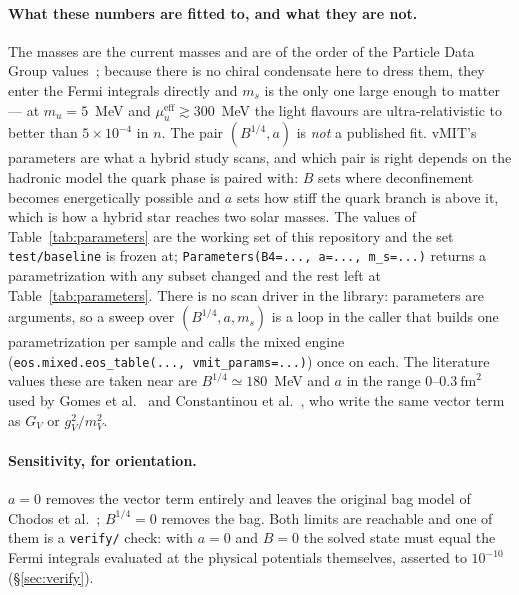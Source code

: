 \documentclass[aps,prc,onecolumn,superscriptaddress,nofootinbib,10pt]{revtex4-2}
\newcommand{\mueff}[1]{\mu^{\mathrm{eff}}_{#1}}
\begin{document}
\paragraph{What these numbers are fitted to, and what they are not.} The
masses are the current masses and are of the order of the Particle Data Group
values~\cite{ParticleDataGroup2024}; because there is no chiral condensate
here to dress them, they enter the Fermi integrals directly and $m_s$ is the
only one large enough to matter --- at $m_u = 5$~MeV and $\mueff{u} \gtrsim
300$~MeV the light flavours are ultra-relativistic to better than
$5\times10^{-4}$ in $n$. The pair $(B^{1/4}, a)$ is \emph{not} a published
fit. vMIT's parameters are what a hybrid study scans, and which pair is right
depends on the hadronic model the quark phase is paired with: $B$ sets where
deconfinement becomes energetically possible and $a$ sets how stiff the quark
branch is above it, which is how a hybrid star reaches two solar masses. The
values of Table~\ref{tab:parameters} are the working set of this repository
and the set \texttt{test/baseline} is frozen at;
\texttt{Parameters(B4=..., a=..., m\_s=...)} returns a parametrization with
any subset changed and the rest left at Table~\ref{tab:parameters}. There is
no scan driver in the library: parameters are arguments, so a sweep over
$(B^{1/4}, a, m_s)$ is a loop in the caller that builds one parametrization
per sample and calls the mixed engine
(\texttt{eos.mixed.eos\_table(..., vmit\_params=...)}) once on each.
The literature values these are taken near are $B^{1/4} \simeq 180$~MeV
and $a$ in the range $0$--$0.3\ \mathrm{fm}^2$ used by
Gomes et al.~\cite{Gomes2019} and Constantinou
et al.~\cite{Constantinou2021,Constantinou2023}, who write the same vector
term as $G_V$ or $g_V^2/m_V^2$.

\paragraph{Sensitivity, for orientation.} $a = 0$ removes the vector term
entirely and leaves the original bag model of Chodos
et al.~\cite{Chodos1974}; $B^{1/4} = 0$ removes the bag. Both limits are
reachable and one of them is a \texttt{verify/} check: with $a = 0$ and
$B = 0$ the solved state must equal the Fermi integrals evaluated at the
physical potentials themselves, asserted to $10^{-10}$
(\S\ref{sec:verify}).
\end{document}
